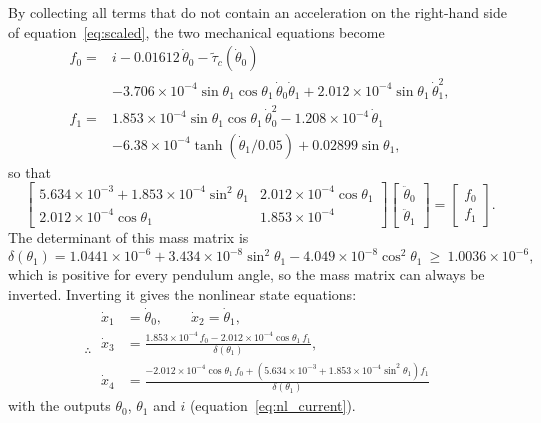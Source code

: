\documentclass[a4paper,11pt]{article}
\begin{document}
By collecting all terms that do not contain an acceleration on the right-hand side of equation~\ref{eq:scaled}, the two mechanical equations become
\begin{equation}
\begin{aligned}
  f_0 = {}& i - 0.01612\,\dot\theta_0 - \tilde\tau_c(\dot\theta_0)\\
  & - 3.706\times10^{-4} \sin\theta_1 \cos\theta_1\, \dot\theta_0 \dot\theta_1 + 2.012\times10^{-4} \sin\theta_1\, \dot\theta_1^2 ,\\[2pt]
  f_1 = {}& 1.853\times10^{-4} \sin\theta_1 \cos\theta_1\, \dot\theta_0^2 - 1.208\times10^{-4}\, \dot\theta_1\\
  & - 6.38\times10^{-4} \tanh\left(\dot\theta_1 / 0.05\right) + 0.02899 \sin\theta_1 ,
\end{aligned}
\label{eq:nl_f}
\end{equation}
so that
\begin{equation}
  \begin{bmatrix} 5.634\times10^{-3} + 1.853\times10^{-4} \sin^2\theta_1 & 2.012\times10^{-4} \cos\theta_1 \\ 2.012\times10^{-4} \cos\theta_1 & 1.853\times10^{-4} \end{bmatrix}
  \begin{bmatrix} \ddot\theta_0 \\ \ddot\theta_1 \end{bmatrix}
  = \begin{bmatrix} f_0 \\ f_1 \end{bmatrix}.
  \label{eq:nl_mass}
\end{equation}
The determinant of this mass matrix is
\begin{equation}
  \delta(\theta_1) = 1.0441\times10^{-6} + 3.434\times10^{-8} \sin^2\theta_1 - 4.049\times10^{-8} \cos^2\theta_1 \ \ge\ 1.0036\times10^{-6} ,
\end{equation}
which is positive for every pendulum angle, so the mass matrix can always be inverted. Inverting it gives the nonlinear state equations:
\begin{equation}
\therefore\;\boxed{
\begin{aligned}
  \dot x_1 &= \dot\theta_0, \qquad \dot x_2 = \dot\theta_1,\\
  \dot x_3 &= \frac{1.853\times10^{-4}\, f_0 - 2.012\times10^{-4} \cos\theta_1\, f_1}{\delta(\theta_1)},\\
  \dot x_4 &= \frac{-2.012\times10^{-4} \cos\theta_1\, f_0 + \left(5.634\times10^{-3} + 1.853\times10^{-4} \sin^2\theta_1\right) f_1}{\delta(\theta_1)}
\end{aligned}
}
\label{eq:nl_num}
\end{equation}
with the outputs $\theta_0$, $\theta_1$ and $i$ (equation~\ref{eq:nl_current}).
\end{document}
